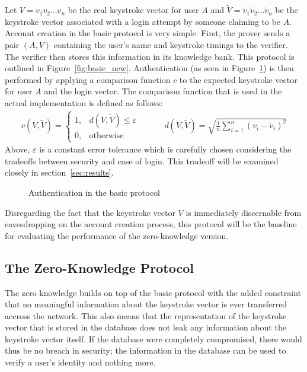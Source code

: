 \documentclass[11pt]{article}
\begin{document}
Let $V=v_1v_2\ldots v_n$ be the real keystroke vector for user $A$ and $\tilde V = \tilde v_1\tilde v_2\ldots\tilde v_n$ be the keystroke vector associated with a login attempt by someone claiming to be $A$. Account creation in the basic protocol is very simple. First, the prover sends a pair $(A,V)$ containing the user's name and keystroke timings to the verifier. The verifier then stores this information in its knowledge bank. This protocol is outlined in Figure~\ref{fig:basic_new}. Authentication (as seen in Figure~\ref{fig:basic_auth}) is then performed by applying a comparison function $c$ to the expected keystroke vector for user $A$ and the login vector. The comparison function that is used in the actual implementation is defined as follows:
$$\begin{array}{ccc}
c(V,\tilde V) = \begin{cases}
  1, & d(V, \tilde V) \le \varepsilon \\
  0, & \text{otherwise}
\end{cases}
& \;\;\;\;\; &
d(V,\tilde V) = \sqrt{\frac1n\sum_{i=1}^n(v_i - \tilde v_i)^2}
\end{array}$$
Above, $\varepsilon$ is a constant error tolerance which is carefully chosen considering the tradeoffs between security and ease of login. This tradeoff will be examined closely in section~\ref{sec:results}.

\begin{figure}[h!]
\centering
{}
\caption{Authentication in the basic protocol}
\label{fig:basic_auth}
\end{figure}


Disregarding the fact that the keystroke vector $V$ is immediately discernable from eavesdropping on the account creation process, this protocol will be the baseline for evaluating the performance of the zero-knowledge version.

\subsection{The Zero-Knowledge Protocol}
The zero knowledge builds on top of the basic protocol with the added constraint that no meaningful information about the keystroke vector is ever transferred accross the network. This also means that the representation of the keystroke vector that is stored in the database does not leak any information about the keystroke vector itself. If the database were completely compromised, there would thus be no breach in security; the information in the database can be used to verify a user's identity and nothing more.
\end{document}
